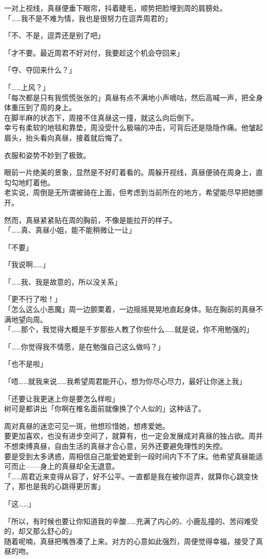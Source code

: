 一对上视线，真昼便垂下眼帘，抖着睫毛，顺势把脸埋到周的肩膀处。\\

「……我不是不难为情，我也是很努力在逗弄周君的」

「不、不是，逗弄还是别了吧」

「才不要。最近周君不好对付，我要趁这个机会夺回来」

「夺、夺回来什么？」

「……上风？」\\

「每次都是只有我慌慌张张的」真昼有点不满地小声嘀咕，然后高喊一声，把全身体重压到了周的身上。\\

在脚半麻的状态下，周接不住真昼这一撞，就这么向后倒下。\\

幸亏有柔软的地毯和靠垫，周没受什么极端的冲击，可背后还是隐隐作痛。他皱起眉头，抬头看向真昼，接着就后悔了。

衣服和姿势不妙到了极致。

眼前一片绝美的景象，显然是不好盯着看的。周躲开视线，真昼便骑在周身上，直勾勾地盯着他。\\

老实说，周倒是无所谓被骑在上面，但考虑到当前所在的地方，希望能尽早把她挪开。

然而，真昼紧紧贴在周的胸前，不像是能拉开的样子。\\

「……真、真昼小姐，能不能稍微让一让」

「不要」

「我说啊……」

「……我、我是故意的，所以没关系」

「更不行了啦！」\\

「怎么这么小恶魔」周一边颤栗着，一边摇摇晃晃地直起身体。贴在胸前的真昼不满地望向周。\\

「……那个，我觉得大概是千岁那些人教了你些什么……就是说，你不用勉强的」

「……你觉得我不情愿，是在勉强自己这么做吗？」

「也不是啦」

「唔……就我来说……我希望周君能开心，想为你尽心尽力，最好让你迷上我」

「还要让我更迷上你是要怎么样啦」\\

树可是都讲出「你啊在椎名面前就像换了个人似的」这种话了。

周对真昼的迷恋可见一斑，他想珍惜她，想疼爱她。\\

要更加喜欢，也没有进步空间了，就算有，也一定会发展成对真昼的独占欲。周并不想束缚真昼，自由生活的真昼才合心意，另外还要避免理性的失控。\\

要是受到太多诱惑，周相信自己能爱她爱到一段时间内下不了床。他希望真昼能适可而止——身上的真昼却全无退意。\\

「……周君近来变得从容了，好不公平。一直都是我在被你逗弄，就算你心跳变快了，那也是我的心跳得更厉害」

「这……」

「所以，有时候也要让你知道我的辛酸……充满了内心的、小鹿乱撞的、苦闷难受的，却又那么舒心的」\\

随着呢喃，真昼把嘴唇凑了上来。对方的心意如此强烈，周便觉得幸福，接受了真昼的吻。
